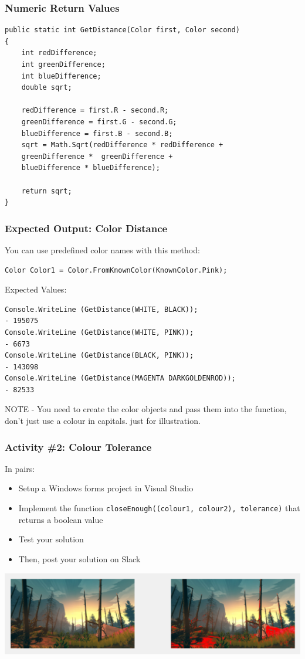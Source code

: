 \begin{frame}[fragile]
	\frametitle{Numeric Return Values}
	
\begin{lstlisting}
public static int GetDistance(Color first, Color second)
{
	int redDifference;
	int greenDifference;
	int blueDifference;
	double sqrt;

	redDifference = first.R - second.R;
	greenDifference = first.G - second.G;
	blueDifference = first.B - second.B;
	sqrt = Math.Sqrt(redDifference * redDifference + 
	greenDifference *  greenDifference +
	blueDifference * blueDifference);

	return sqrt;		
}
\end{lstlisting}


\end{frame}

\begin{frame}[fragile]
	\frametitle{Expected Output: Color Distance}
 You can use predefined color names with this method:
\begin{lstlisting}
Color Color1 = Color.FromKnownColor(KnownColor.Pink);	
\end{lstlisting}
Expected Values:	
\begin{lstlisting}
Console.WriteLine (GetDistance(WHITE, BLACK));
- 195075
Console.WriteLine (GetDistance(WHITE, PINK));
- 6673
Console.WriteLine (GetDistance(BLACK, PINK));
- 143098
Console.WriteLine (GetDistance(MAGENTA DARKGOLDENROD));
- 82533
\end{lstlisting}
NOTE - You need to create the color objects and pass them into the function, don't just use a colour in capitals. just for illustration.  
\end{frame}

\begin{frame}
	\frametitle{Activity \#2: Colour Tolerance}
	
	In pairs:
	
	\vspace{.5em}
	
	\begin{itemize}		
		\item Setup a Windows forms project in Visual Studio
		\item Implement the function \texttt{closeEnough((colour1, colour2), tolerance)} that returns a boolean value
		\item Test your solution
		\item Then, post your solution on Slack
	\end{itemize}
	\vspace{.5em}
\includegraphics[scale=0.5]{GoingRed}
\end{frame}


